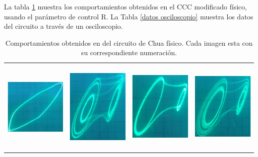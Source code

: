 \documentclass{rbf}
\begin{document}
La tabla \ref{circuitos físicos} muestra los comportamientos obtenidos en el CCC modificado físico, usando el parámetro de control R. La Tabla \ref{datos osciloscopio} muestra los datos del circuito a través de un osciloscopio.
\begin{table}[h]
    \centering
    \caption{\label{circuitos físicos} 
    Comportamientos obtenidos en del circuito de Chua físico. Cada imagen esta con su correspondiente numeración.\\}
    \begin{tabular}{c c c c}
    \hline    
    \includegraphics[width=4.5cm,height=4.5cm]{Fotos_Chua_Experimentales/Chua1.jpg}&
    \includegraphics[width=4.5cm,height=4.5cm]{Fotos_Chua_Experimentales/Chua2.jpg}&
    \includegraphics[width=4.5cm,height=4.5cm]{Fotos_Chua_Experimentales/Chua3.jpg}&
    \includegraphics[width=4.5cm,height=4.5cm]{Fotos_Chua_Experimentales/Chua4.jpg}&

\end{tabular}
\end{table}
\end{document}
